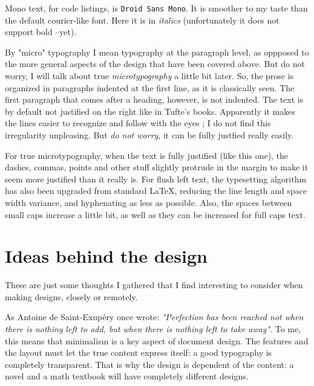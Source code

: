 \documentclass[
    11pt,
]{tufte-style-thesis}
\begin{document}
Mono text, for code listings, is \texttt{Droid Sans Mono}. It is smoother to my taste than the default courier-like font. Here it is in {\ttfamily\itshape italics} (unfortunately it does not support bold --yet).

By "micro" typography I mean typography at the paragraph level, as oppposed to the more general aspects of the design that have been covered above. But do not worry, I will talk about true \textit{microtypography} a little bit later. So, the prose is organized in paragraphs indented at the first line, as it is classically seen. The first paragraph that comes after a heading, however, is not indented. The text is by default not justified on the right like in Tufte's books. Apparently it makes the lines easier to recognize and follow with the eyes ; I do not find this irregularity unpleasing. But \textit{do not worry}, it can be fully justfied really easily.

\bgroup\justifying
For true microtypography, when the text is fully justified (like this one), the dashes, commas, points and other stuff slightly protrude in the margin to make it seem more justified than it really is. For flush left text, the typesetting algorithm has also been upgraded from standard \LaTeX, reducing the line length and space width variance, and hyphenating as less as possible. Also, the spaces between small caps increase a little bit, as well as they can be increased for full caps text.
\egroup


\section{Ideas behind the design}

These are just some thoughts I gathered that I find interesting to consider when making designs, closely or remotely.

As Antoine de Saint-Exupéry once wrote: \textit{"Perfection has been reached not when there is nothing left to add, but when there is nothing left to take away"}. To me, this means that minimalism is a key aspect of document design. The features and the layout must let the true content express itself: a good typography is completely transparent. That is why the design is dependent of the content: a novel and a math textbook will have completely different designs.
\end{document}
